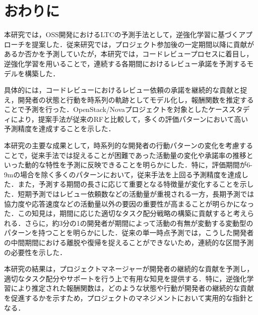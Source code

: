 \documentclass[11pt]{jreport}
\begin{document}
\chapter{おわりに}
\label{sec:conclusion}
本研究では，OSS開発におけるLTCの予測手法として，逆強化学習に基づくアプローチを提案した．従来研究では，プロジェクト参加後の一定期間以降に貢献があるか否かを予測していたが，本研究では，コードレビュープロセスに着目し，逆強化学習を用いることで，連続する各期間におけるレビュー承諾を予測するモデルを構築した．

具体的には，コードレビューにおけるレビュー依頼の承諾を継続的な貢献と捉え，開発者の状態と行動を時系列の軌跡としてモデル化し，報酬関数を推定することで予測を行った．OpenStack/Novaプロジェクトを対象としたケーススタディにより，提案手法が従来のRFと比較して，多くの評価パターンにおいて高い予測精度を達成することを示した．

本研究の主要な成果として，時系列的な開発者の行動パターンの変化を考慮することで，従来手法では捉えることが困難であった活動量の変化や承諾率の推移といった動的な特性を予測に反映できることを明らかにした．特に，評価期間が6-9mの場合を除く多くのパターンにおいて，従来手法を上回る予測精度を達成した．また，予測する期間の長さに応じて重要となる特徴量が変化することを示した．短期予測ではレビュー依頼数などの活動量が重視される一方，長期予測では協力度や応答速度などの活動量以外の要因の重要性が高まることが明らかになった．この知見は，期間に応じた適切なタスク配分戦略の構築に貢献すると考えられる．さらに，約3分の1の開発者が期間によって活動の有無が変動する変動型のパターンを持つことを明らかにした．従来の単一時点予測では，こうした開発者の中間期間における離脱や復帰を捉えることができないため，連続的な区間予測の必要性を示した．

本研究の結果は，プロジェクトマネージャーが開発者の継続的な貢献を予測し，適切なタスク配分やサポートを行う上で有用な知見を提供する．特に，逆強化学習により推定された報酬関数は，どのような状態や行動が開発者の継続的な貢献を促進するかを示すため，プロジェクトのマネジメントにおいて実用的な指針となる．

\end{document}
